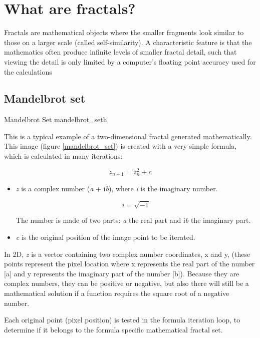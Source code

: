 \section{What are fractals?}\label{what-are-fractals}

Fractals are mathematical objects where the smaller fragments look
similar to those on a larger scale (called self-similarity). A characteristic feature is that the mathematics often produce infinite levels of smaller fractal detail, such that viewing the detail is only limited by a computer's floating point accuracy used for the calculations

\subsection{Mandelbrot set}\label{mandelbrot-set}

{Mandelbrot Set}
{mandelbrot_set}{h}

This is a typical example of a two-dimensional fractal generated mathematically.
This image (figure \ref{mandelbrot_set}) is created with a very simple formula, which is calculated in many
iterations:

\[z_{n + 1} = z_{n}^{2} + c\]

\begin{itemize}
		
		
	\item\emph{z} is a complex number (\emph{a} + i\emph{b}), where \emph{i} is
	the imaginary number.
		
	\[ i = \sqrt{-1} \]
		
	The number is made of two parts: \emph{a} the real part and i\emph{b} the
	imaginary part.
		
	\item\emph{c} is the original position of the image point to be iterated.
\end{itemize}

In 2D, \emph{z} is a vector containing two complex number coordinates, x and y,
(these points represent the pixel location where x represents the real part of
the number {[}a{]} and y represents the imaginary part of the number {[}b{]}).
Because they are complex numbers, they can be positive or negative, but also
there will still be a mathematical solution if a function requires the square
root of a negative number.

Each original point (pixel position) is tested in the formula iteration loop, to
determine if it belongs to the formula specific mathematical fractal set.

